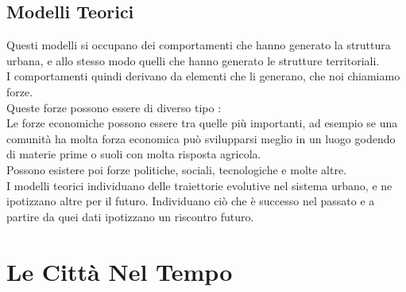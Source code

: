 \documentclass[a4paper,12pt, oneside]{book}
\begin{document}
  \section{Modelli Teorici}
  Questi modelli si occupano dei comportamenti che hanno generato la struttura urbana, e allo stesso modo quelli che hanno generato le strutture territoriali.\\
  I comportamenti quindi derivano da elementi che li generano, che noi chiamiamo forze.\\
  Queste forze possono essere di diverso tipo : \\
  Le forze economiche possono essere tra quelle più importanti, ad esempio se una comunità ha molta forza economica può svilupparsi meglio in un luogo godendo di materie prime o suoli con molta risposta agricola.\\
  Possono esistere poi forze politiche, sociali, tecnologiche e molte altre.\\
  I modelli teorici individuano delle traiettorie evolutive nel sistema urbano, e ne ipotizzano altre per il futuro. Individuano ciò che è successo nel passato e a partire da quei dati ipotizzano un riscontro futuro.\\
  \chapter{Le Città Nel Tempo}
\end{document}
